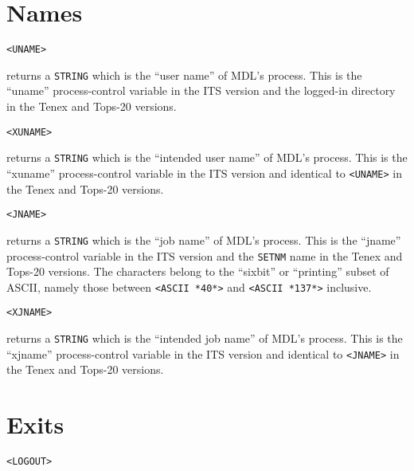 \documentclass[a4paper]{scrbook}
\begin{document}
\section{Names}\label{names}

\begin{verbatim}
<UNAME>
\end{verbatim}

 returns a \texttt{STRING} which is the ``user name'' of MDL's process. This is the ``uname''
process-control variable in the ITS version and the logged-in directory in the Tenex and Tops-20
versions.

\begin{verbatim}
<XUNAME>
\end{verbatim}

 returns a \texttt{STRING} which is the ``intended user name'' of MDL's process. This is the
``xuname'' process-control variable in the ITS version and identical to \texttt{\textless{}UNAME\textgreater{}} in the
Tenex and Tops-20 versions.

\begin{verbatim}
<JNAME>
\end{verbatim}

 returns a \texttt{STRING} which is the ``job name'' of MDL's process. This is the ``jname''
process-control variable in the ITS version and the \texttt{SETNM} name in the Tenex and Tops-20 versions. The characters
belong to the ``sixbit'' or ``printing'' subset of ASCII, namely those between
\texttt{\textless{}ASCII\ *40*\textgreater{}} and \texttt{\textless{}ASCII\ *137*\textgreater{}} inclusive.

\begin{verbatim}
<XJNAME>
\end{verbatim}

 returns a \texttt{STRING} which is the ``intended job name'' of MDL's process. This is the
``xjname'' process-control variable in the ITS version and identical to \texttt{\textless{}JNAME\textgreater{}} in the
Tenex and Tops-20 versions.

\section{Exits}\label{exits}

\begin{verbatim}
<LOGOUT>
\end{verbatim}
\end{document}
